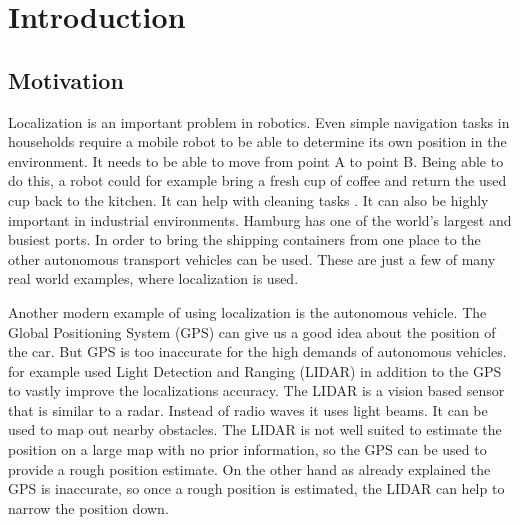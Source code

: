 \chapter{Introduction} %
\label{Chapter1}

\section{Motivation}
Localization is an important problem in robotics. Even simple navigation tasks in households require a mobile robot to be able to determine its own position in the environment. It needs to be able to move from point A to point B. Being able to do this, a robot could for example bring a fresh cup of coffee and return the used cup back to the kitchen. It can help with cleaning tasks \citep{pinheiro2015cleaning}. It can also be highly important in industrial environments. Hamburg has one of the world's largest and busiest ports. In order to bring the shipping containers from one place to the other autonomous transport vehicles can be used. These are just a few of many real world examples, where localization is used.

Another modern example of using localization is the autonomous vehicle. The Global Positioning System (\Gls{GPS}) \citep{misra2006global} can give us a good idea about the position of the car. But \Gls{GPS} is too inaccurate for the high demands of autonomous vehicles. \citet{DBLP:conf/rss/LevinsonMT07} for example used Light Detection and Ranging (\Gls{LIDAR}) \citep{Lidar} in addition to the \Gls{GPS} to vastly improve the localizations accuracy. The \Gls{LIDAR} is a vision based sensor that is similar to a radar. Instead of radio waves it uses light beams. It can be used to map out nearby obstacles. The \Gls{LIDAR} is not well suited to estimate the position on a large map with no prior information, so the \Gls{GPS} can be used to provide a rough position estimate. On the other hand as already explained the \Gls{GPS} is inaccurate, so once a rough position is estimated, the \Gls{LIDAR} can help to narrow the position down. 

